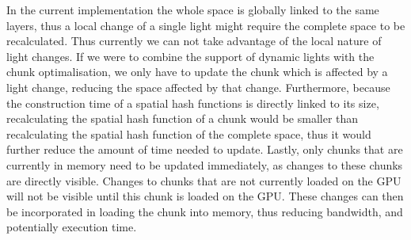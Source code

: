 In the current implementation the whole space is globally linked to the same layers, thus a local
change of a single light might require the complete space to be recalculated. Thus currently we
can not take advantage of the local nature of light changes. If we were to combine the support
of dynamic lights with the chunk optimalisation, we only have to update the chunk which is affected
by a light change, reducing the space affected by that change. Furthermore, because the construction
time of a spatial hash functions is directly linked to its size, recalculating the spatial hash function
of a chunk would be smaller than recalculating the spatial hash function of the complete space, thus it
would further reduce the amount of time needed to update.
Lastly, only chunks that are currently in memory need to be updated immediately, as changes to these
chunks are directly visible. Changes to chunks that are not currently loaded on the GPU will not be visible
until this chunk is loaded on the GPU. These changes can then be incorporated in loading the chunk into
memory, thus reducing bandwidth, and potentially execution time.

